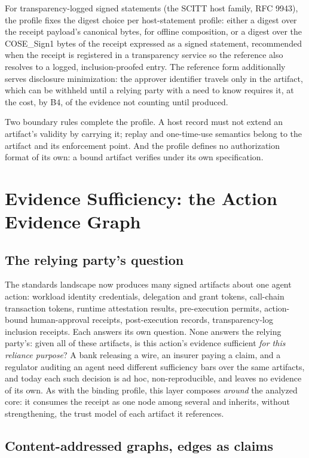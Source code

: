 \documentclass[11pt]{article}
\begin{document}
For transparency-logged signed statements (the SCITT host family, RFC 9943), the
profile fixes the digest choice per host-statement profile: either a digest over
the receipt payload's canonical bytes, for offline composition, or a digest over
the COSE\_Sign1 bytes of the receipt expressed as a signed statement, recommended
when the receipt is registered in a transparency service so the reference also
resolves to a logged, inclusion-proofed entry. The reference form additionally
serves disclosure minimization: the approver identifier travels only in the artifact,
which can be withheld until a relying party with a need to know requires it, at the
cost, by B4, of the evidence not counting until produced.

Two boundary rules complete the profile. A host record must not extend an
artifact's validity by carrying it; replay and one-time-use semantics belong to
the artifact and its enforcement point. And the profile defines no authorization
format of its own: a bound artifact verifies under its own specification.

\section{Evidence Sufficiency: the Action Evidence Graph}

\subsection{The relying party's question}

The standards landscape now produces many signed artifacts about one agent action:
workload identity credentials, delegation and grant tokens, call-chain transaction
tokens, runtime attestation results, pre-execution permits, action-bound
human-approval receipts, post-execution records, transparency-log inclusion
receipts. Each answers its own question. None answers the relying party's: given
all of these artifacts, is this action's evidence sufficient \emph{for this
reliance purpose}? A bank releasing a wire, an insurer paying a claim, and a
regulator auditing an agent need different sufficiency bars over the same
artifacts, and today each such decision is ad hoc, non-reproducible, and leaves no
evidence of its own. As with the binding profile, this layer composes \emph{around}
the analyzed core: it consumes the receipt as one node among several and inherits,
without strengthening, the trust model of each artifact it references.

\subsection{Content-addressed graphs, edges as claims}
\end{document}

